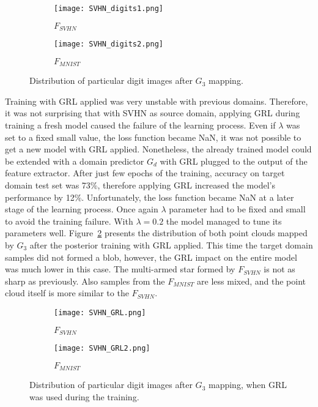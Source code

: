 \documentclass{article}
\begin{document}
\begin{figure}[htb]%
    \centering
    \begin{subfigure}[b]{0.48\textwidth}
        \texttt{[image: SVHN\_digits1.png]}
        \caption{$F_{SVHN}$}
    \end{subfigure}%
    \begin{subfigure}[b]{0.48\textwidth}
        \texttt{[image: SVHN\_digits2.png]}
        \caption{$F_{MNIST}$}
    \end{subfigure}%
    \caption{Distribution of particular digit images after $G_{3}$ mapping.}%
    \label{fig:SVHN_Digits}%
\end{figure}
\par
Training with GRL applied was very unstable with previous domains. Therefore, it was not surprising that with SVHN as source domain, applying GRL during training a fresh model caused the failure of the learning process. Even if $\lambda$ was set to a fixed small value, the loss function became NaN, it was not possible to get a new model with GRL applied. Nonetheless, the already trained model could be extended with a domain predictor $G_{d}$ with GRL plugged to the output of the feature extractor. After just few epochs of the training, accuracy on target domain test set was 73\%, therefore applying GRL increased the model's performance by 12\%. Unfortunately, the loss function became NaN at a later stage of the learning process. Once again $\lambda$ parameter had to be fixed and small to avoid the training failure. With $\lambda = 0.2$ the model managed to tune its parameters well. Figure~\ref{fig:SVHN_GRL} presents the distribution of both point clouds mapped by $G_{3}$ after the posterior training with GRL applied. This time the target domain samples did not formed a blob, however, the GRL impact on the entire model was much lower in this case. The multi-armed star formed by $F_{SVHN}$ is not as sharp as previously. Also samples from the $F_{MNIST}$ are less mixed, and the point cloud itself is more similar to the $F_{SVHN}$.

\begin{figure}[htb]%
    \centering
    \begin{subfigure}[b]{0.48\textwidth}
        \texttt{[image: SVHN\_GRL.png]}
        \caption{$F_{SVHN}$}
    \end{subfigure}%
    \begin{subfigure}[b]{0.48\textwidth}
        \texttt{[image: SVHN\_GRL2.png]}
        \caption{$F_{MNIST}$}
    \end{subfigure}%
    \caption{Distribution of particular digit images after $G_{3}$ mapping, when GRL was used during the training.}%
    \label{fig:SVHN_GRL}%
\end{figure}
\end{document}
